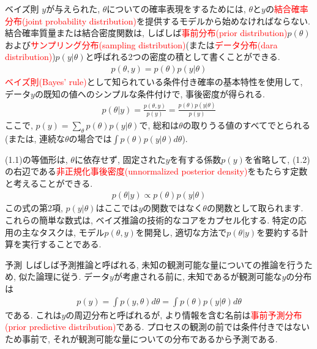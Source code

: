 \documentclass[10pt,dvipdfmx,a4]{beamer}
\newcommand{\eq}[1]{\begin{align}#1\end{align}}
\newcommand{\eqn}[1]{\begin{align*}#1\end{align*}}
\newcommand{\tcr}[1]{\textcolor{red}{#1}}
\begin{document}

\begin{frame}{ベイズ則}
$y$が与えられた, $\theta$についての確率表現をするためには, $\theta$と$y$の\tcr{結合確率分布(joint probability distribution)}を提供するモデルから始めなければならない.
結合確率質量または結合密度関数は, しばしば\tcr{事前分布(prior distribution)}$p(\theta)$および\tcr{サンプリング分布(sampling distribution)}(または\tcr{データ分布(dara distribution)})$p(y|\theta)$と呼ばれる2つの密度の積として書くことができる.
\eqn{p(\theta,y)=p(\theta)p(y|\theta)}
\tcr{ベイズ則(Bayes' rule)}として知られている条件付き確率の基本特性を使用して, データ$y$の既知の値へのシンプルな条件付けで, 事後密度が得られる.
\eq{p(\theta|y)=\frac{p(\theta,y)}{p(y)}=\frac{p(\theta)p(y|\theta)}{p(y)}}
ここで, $p(y)=\sum_{\theta}p(\theta)p(y|\theta)$で, 総和は$\theta$の取りうる値のすべてでとられる(または, 連続な$\theta$の場合では$\int p(\theta)p(y|\theta)d\theta$).
\end{frame}


\begin{frame}
(1.1)の等価形は, $\theta$に依存せず, 固定された$y$を有する係数$p(y)$を省略して, (1.2)の右辺である\tcr{非正規化事後密度(unnormalized posterior density)}をもたらす定数と考えることができる.
\eq{p(\theta|y)\propto p(\theta)p(y|\theta)}
この式の第2項, $p(y|\theta)$はここでは$y$の関数ではなく$\theta$の関数として取られます.
これらの簡単な数式は, ベイズ推論の技術的なコアをカプセル化する.
特定の応用の主なタスクは, モデル$p(\theta,y)$を開発し, 適切な方法で$p(\theta|y)$を要約する計算を実行することである.
\end{frame}


\begin{frame}{予測}
しばしば予測推論と呼ばれる, 未知の観測可能な量についての推論を行うため, 似た論理に従う.
データ$y$が考慮される前に, 未知であるが観測可能な$y$の分布は
\eq{p(y)=\int p(y,\theta)d\theta=\int p(\theta)p(y|\theta)d\theta}
である.
これは$y$の周辺分布と呼ばれるが, より情報を含む名前は\tcr{事前予測分布(prior predictive distribution)}である.
プロセスの観測の前では条件付きではないため事前で, それが観測可能な量についての分布であるから予測である.
\end{frame}

\end{document}
